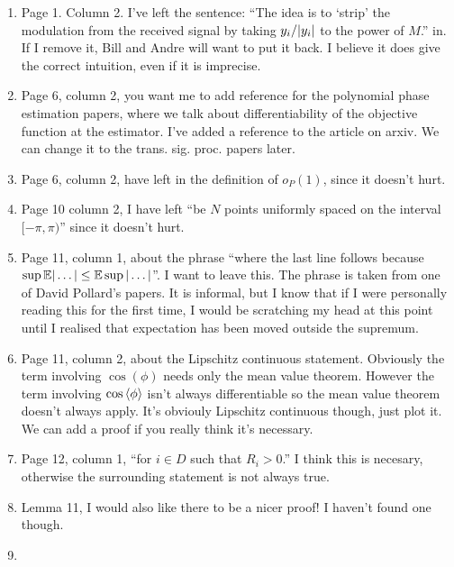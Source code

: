 \documentclass[a4paper,12pt]{article}
\begin{document}
\begin{enumerate}
\item Page 1. Column 2. I've left the sentence: ``The idea is to `strip' the modulation from the received signal by taking $y_i / {\left\vert y_i \right\vert}$ to the power of $M$.'' in.  If I remove it, Bill and Andre will want to put it back.  I believe it does give the correct intuition, even if it is imprecise.
\item Page 6, column 2, you want me to add reference for the polynomial phase estimation papers, where we talk about differentiability of the objective function at the estimator.  I've added a reference to the article on arxiv.  We can change it to the trans. sig. proc. papers later.
\item Page 6, column 2, have left in the definition of $o_P(1)$, since it doesn't hurt.
\item Page 10 column 2, I have left ``be $N$ points uniformly spaced on the interval $[-\pi, \pi)$'' since it doesn't hurt.
\item Page 11, column 1, about the phrase ``where the last line follows because $\sup {\mathbb E}\vert \dots\vert \leq {\mathbb E} \sup \vert \dots \vert$''.  I want to leave this.  The phrase is taken from one of David Pollard's papers.  It is informal, but I know that if I were personally reading this for the first time, I would be scratching my head at this point until I realised that expectation has been moved outside the supremum.
\item Page 11, column 2, about the Lipschitz continuous statement.  Obviously the term involving $\cos(\phi)$ needs only the mean value theorem.  However the term involving $\cos\left\langle \phi \right\rangle$ isn't always differentiable so the mean value theorem doesn't always apply.  It's obviouly Lipschitz continuous though, just plot it.  We can add a proof if you really think it's necessary.
\item Page 12, column 1, ``for $i \in D$ such that $R_i > 0$.'' I think this is necesary, otherwise the surrounding statement is not always true.
\item Lemma 11, I would also like there to be a nicer proof!  I haven't found one though.
\item 
\end{enumerate}
\end{document}
